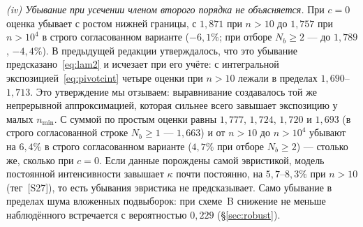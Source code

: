 \documentclass[11pt,a4paper]{article}
\theoremstyle{plain}
\theoremstyle{remark}
\begin{document}
\emph{(iv) Убывание при усечении членом второго порядка не объясняется.} При $c=0$
оценка убывает с ростом нижней границы, с $1{,}871$ при $n>10$ до $1{,}757$ при
$n>10^4$ в строго согласованном варианте ($-6{,}1\%$; при отборе $N_b\ge2$ --- до
$1{,}789$, $-4{,}4\%$). В предыдущей редакции утверждалось, что это убывание
предсказано~\eqref{eq:lam2} и исчезает при его учёте: с интегральной
экспозицией~\eqref{eq:pivotcint} четыре оценки при $n>10$ лежали в пределах
$1{,}690$--$1{,}713$. Это утверждение мы отзываем: выравнивание создавалось той же
непрерывной аппроксимацией, которая сильнее всего завышает экспозицию у малых
$n_{\min}$. С суммой по простым оценки равны $1{,}777$, $1{,}724$, $1{,}720$ и
$1{,}693$ (в строго согласованной строке $N_b\ge1$ --- $1{,}663$) и от $n>10$ до
$n>10^4$ убывают на $6{,}4\%$ в строго согласованном варианте ($4{,}7\%$ при отборе
$N_b\ge2$) --- столько же, сколько при $c=0$. Если данные
порождены самой эвристикой, модель постоянной интенсивности завышает $\kappa$ почти
постоянно, на $5{,}7$--$8{,}3\%$ при $n>10$ (тег~[S27]), то есть убывания эвристика
не предсказывает. Само убывание в пределах шума вложенных подвыборок: при схеме~B
снижение не меньше наблюдённого встречается с вероятностью $0{,}229$
(\S\ref{sec:robust}).
\end{document}
